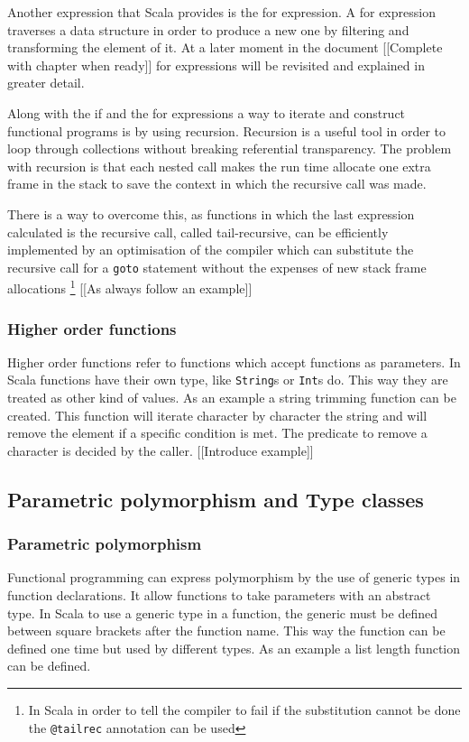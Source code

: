 \documentclass[../main.tex]{subfiles}
\begin{document}
Another expression that Scala provides is the for expression. A for expression
traverses a data structure in order to produce a new one by filtering and
transforming the element of it. At a later moment in the document [[Complete
with chapter when ready]] for expressions will be revisited and explained in
greater detail.

Along with the if and the for expressions a way to iterate and construct
functional programs is by using recursion. Recursion is a useful tool in order
to loop through collections without breaking referential transparency. The
problem with recursion is that each nested call makes the run time allocate one
extra frame in the stack to save the context in which the recursive call was
made.

There is a way to overcome this, as functions in which the last expression
calculated is the recursive call, called tail-recursive, can be efficiently
implemented by an optimisation of the compiler which can substitute the
recursive call for a \texttt{goto} statement without the expenses of new stack
frame allocations \autocite{Steele1977DebunkingGoto} \footnote{In Scala in order
to tell the compiler to fail if the substitution cannot be done the
\texttt{@tailrec} annotation can be
used\autocite{ScalaScala.annotation.tailrec}} [[As always follow an example]]

\subsubsection{Higher order functions} Higher order functions refer to functions
which accept functions as parameters. In Scala functions have their own type,
like \texttt{String}s or \texttt{Int}s do. This way they are treated as other
kind of values. As an example a string trimming function can be created. This
function will iterate character by character the string and will remove the
element if a specific condition is met. The predicate to remove a character is
decided by the caller. [[Introduce example]]

\subsection{Parametric polymorphism and Type classes}
\subsubsection{Parametric polymorphism} Functional programming can express
polymorphism by the use of generic types in function declarations. It allow
functions to take parameters with an abstract type. In Scala to use a generic
type in a function, the generic must be defined between square brackets after
the function name. This way the function can be defined one time but used by
different types. As an example a list length function can be defined.
\end{document}
